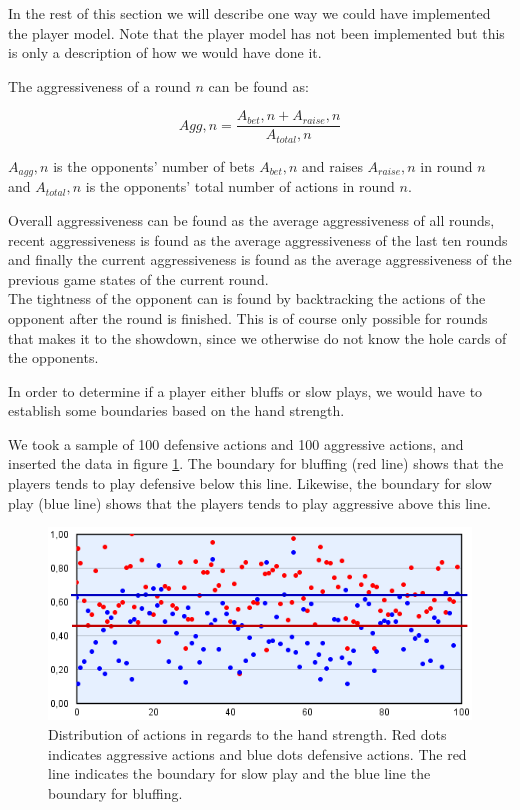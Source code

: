 In the rest of this section we will describe one way we could have implemented the player model. Note that the player model has not been implemented but this is only a description of how we would have done it.

The aggressiveness of a round $n$ can be found as:

\[Agg,n = \frac{A_{bet},n + A_{raise},n}{A_{total},n}\]

$A_{agg},n$ is the opponents' number of bets $A_{bet},n$ and raises $A_{raise},n$ in round $n$ and  $A_{total},n$ is the opponents' total number of actions in round $n$. 

Overall aggressiveness can be found as the average aggressiveness of all rounds, recent aggressiveness is found as the average aggressiveness of the last ten rounds and finally the current aggressiveness is found as the average aggressiveness of the previous game states of the current round.\\

The tightness of the opponent can is found by backtracking the actions of the opponent after the round is finished. This is of course only possible for rounds that makes it to the showdown, since we otherwise do not know the hole cards of the opponents.

In order to determine if a player either bluffs or slow plays, we would have to establish some boundaries based on the hand strength. 

We took a sample of 100 defensive actions and 100 aggressive actions, and inserted the data in figure \ref{fig:dist-act}. The boundary for bluffing (red line) shows that the players tends to play defensive below this line. Likewise, the boundary for slow play (blue line) shows that the players tends to play aggressive above this line.

\begin{figure}[H]
  \center
    \includegraphics[scale=0.775]{images/modeling/action-dist.png}
  \caption{Distribution of actions in regards to the hand strength. Red dots indicates aggressive actions and blue dots defensive actions. The red line indicates the boundary for slow play and the blue line the boundary for bluffing. \label{fig:dist-act}}
\end{figure}


